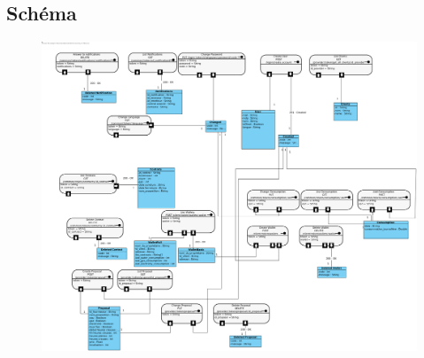\subsection{Schéma}
\begin{figure}[h]
\includegraphics[width = 1.3\textwidth]{Base/api-rest/img/apirest.png}
\end{figure}

